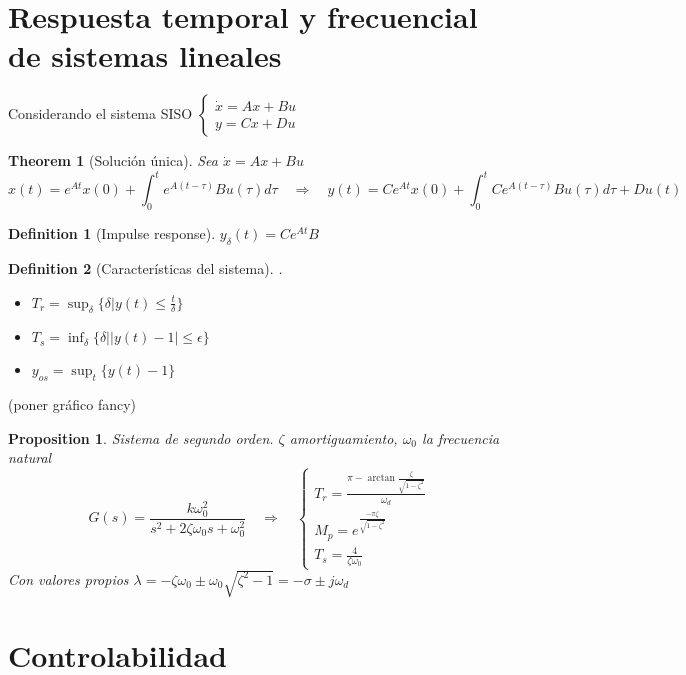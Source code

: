 \documentclass[leqno]{article}
\newtheorem*{theorem}{Theorem}
\newtheorem*{proposition}{Proposition}
\newtheorem*{definition}{Definition}
\begin{document}
\section{Respuesta temporal y frecuencial de sistemas lineales}


Considerando el sistema SISO $\displaystyle \begin{cases}
  \dot{x} = Ax + Bu \\
  y = Cx+Du
\end{cases}$

\begin{theorem}[Solución única] Sea $\dot{x} = Ax + Bu$ 
  \[
 x(t) = e^{At}x(0) + \int_0^t e^{A(t-\tau )}Bu(\tau )d\tau \quad  \Rightarrow \quad
 y(t) = Ce^{At}x(0) + \int_0^t Ce^{A(t-\tau )}Bu(\tau )d\tau + Du(t)
  \] 
\end{theorem}

\begin{definition}[Impulse response] $y_\delta(t) = Ce^{At}B$

\end{definition}

\begin{definition}[Características del sistema] . 
  \begin{itemize}[topsep=-6pt, itemsep=0pt]
	\item $T_r = \sup_{\delta} \{\delta | y(t)\le \frac{t}{\delta}\}$ 
	\item $T_s=\inf_{\delta} \{\delta| |y(t)-1|\le \epsilon \}$ 
	\item $y_{os}= \sup_t\{y(t)-1\}$
  \end{itemize}
\end{definition}

(poner gráfico fancy)

\begin{proposition}
Sistema de segundo orden. $\zeta$ amortiguamiento, $\omega _0$ la frecuencia natural
\[
G(s)=\frac{k\omega _0^2}{s^2+2\zeta \omega _0 s + \omega _{0}^2} \quad \Rightarrow \quad\begin{cases}
  T_r = \frac{\pi - \arctan \frac{\zeta}{\sqrt{1-\zeta^2} }}{\omega _d}\\
  M_p = e^{\frac{-\pi \zeta}{\sqrt{1-\zeta^2} }}\\
  T_s = \frac{4}{\zeta\omega _0}
\end{cases}
\] 
Con valores propios $\lambda= -\zeta \omega _0 \pm \omega _0\sqrt{\zeta^2-1}  = -\sigma \pm j\omega _d$
\end{proposition}


\section{Controlabilidad}
\end{document}
